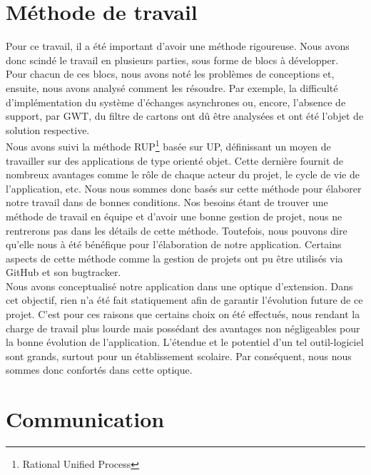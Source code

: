   \section{Méthode de travail}
Pour ce travail, il a été important d'avoir une méthode rigoureuse. Nous avons donc scindé le travail en plusieurs parties, sous forme de blocs à développer.\\
\newline
\indent
Pour chacun de ces blocs, nous avons noté les problèmes de conceptions et, ensuite, nous avons analysé comment les résoudre. Par exemple,  la difficulté d'implémentation du système d'échanges asynchrones ou, encore, l'absence de support, par GWT, du filtre de cartons ont dû être analysées et ont été l'objet de solution respective. \\
\newline
\indent
Nous avons suivi la méthode RUP\footnote{Rational Unified Process} basée sur UP, définissant un moyen de travailler sur des applications de type orienté objet. Cette dernière fournit de nombreux avantages comme le rôle de chaque acteur du projet, le cycle de vie de l'application, etc. Nous nous sommes donc basés sur cette méthode pour élaborer notre travail dans de bonnes conditions.
\newline
\indent
Nos besoins étant de trouver une méthode de travail en équipe et d'avoir une bonne gestion de projet, nous ne rentrerons pas dans les détails de cette méthode. Toutefois, nous pouvons dire qu'elle nous à été bénéfique pour l'élaboration de notre application. Certains aspects de cette méthode comme la gestion de projets ont pu être utilisés via GitHub et son bugtracker. \\
\newline
\indent
Nous avons conceptualisé notre application dans une optique d'extension. Dans cet objectif, rien n'a été fait statiquement afin de garantir l'évolution future de ce projet. C'est pour ces raisons que certains choix on été effectués, nous rendant la charge de travail plus lourde mais possédant des avantages non négligeables pour la bonne évolution de l'application. L'étendue et le potentiel d'un tel outil-logiciel sont grands, surtout pour un établissement scolaire. Par conséquent, nous nous sommes donc confortés dans cette optique.

\section{Communication}

